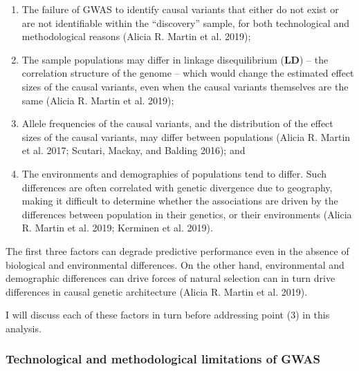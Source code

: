 \documentclass[
]{book}
\begin{document}
\begin{enumerate}
\def\labelenumi{\arabic{enumi}.}
\item
  The failure of GWAS to identify causal variants that either do not exist or are not identifiable within the ``discovery'' sample, for both technological and methodological reasons (Alicia R. Martin et al. 2019);
\item
  The sample populations may differ in linkage disequilibrium (\textbf{LD}) -- the correlation structure of the genome -- which would change the estimated effect sizes of the causal variants, even when the causal variants themselves are the same (Alicia R. Martin et al. 2019);
\item
  Allele frequencies of the causal variants, and the distribution of the effect sizes of the causal variants, may differ between populations (Alicia R. Martin et al. 2017; Scutari, Mackay, and Balding 2016); and
\item
  The environments and demographies of populations tend to differ. Such differences are often correlated with genetic divergence due to geography, making it difficult to determine whether the associations are driven by the differences between population in their genetics, or their environments (Alicia R. Martin et al. 2019; Kerminen et al. 2019).
\end{enumerate}

The first three factors can degrade predictive performance even in the absence of biological and environmental differences. On the other hand, environmental and demographic differences can drive forces of natural selection can in turn drive differences in causal genetic architecture (Alicia R. Martin et al. 2019).

I will discuss each of these factors in turn before addressing point (3) in this analysis.

\hypertarget{fst-discovery-sec}{%
\subsubsection{Technological and methodological limitations of GWAS}\label{fst-discovery-sec}}
\end{document}
